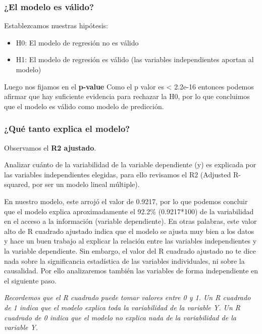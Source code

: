 \documentclass[
]{article}
\providecommand{\tightlist}{%
  \setlength{\itemsep}{0pt}\setlength{\parskip}{0pt}}
\begin{document}
\subsubsection{\texorpdfstring{\textbf{¿El modelo es
válido?}}{¿El modelo es válido?}}\label{el-modelo-es-vuxe1lido}

Establezcamos nuestras hipótesis:

\begin{itemize}
\tightlist
\item
  H0: El modelo de regresión no es válido
\item
  H1: El modelo de regresión es válido (las variables independientes
  aportan al modelo)
\end{itemize}

Luego nos fijamos en el \textbf{p-value} Como el p valor es \textless{}
2.2e-16 entonces podemos afirmar que hay suficiente evidencia para
rechazar la H0, por lo que concluimos que el modelo es válido como
modelo de predicción.

\subsubsection{\texorpdfstring{\textbf{¿Qué tanto explica el
modelo?}}{¿Qué tanto explica el modelo?}}\label{quuxe9-tanto-explica-el-modelo}

Observamos el \textbf{R2 ajustado}.

Analizar cuánto de la variabilidad de la variable dependiente (y) es
explicada por las variables independientes elegidas, para ello revisamos
el R2 (Adjusted R-squared, por ser un modelo lineal múltiple).

En nuestro modelo, este arrojó el valor de 0.9217, por lo que podemos
concluir que el modelo explica aproximadamente el 92.2\% (0.9217*100) de
la variabilidad en el acceso a la información (variable dependiente). En
otras palabras, este valor alto de R cuadrado ajustado indica que el
modelo se ajusta muy bien a los datos y hace un buen trabajo al explicar
la relación entre las variables independientes y la variable
dependiente. Sin embargo, el valor del R cuadrado ajustado no te dice
nada sobre la significancia estadística de las variables individuales,
ni sobre la causalidad. Por ello analizaremos también las variables de
forma independiente en el siguiente paso.

\emph{Recordemos que el R cuadrado puede tomar valores entre 0 y 1. Un R
cuadrado de 1 indica que el modelo explica toda la variabilidad de la
variable Y. Un R cuadrado de 0 indica que el modelo no explica nada de
la variabilidad de la variable Y.}
\end{document}

